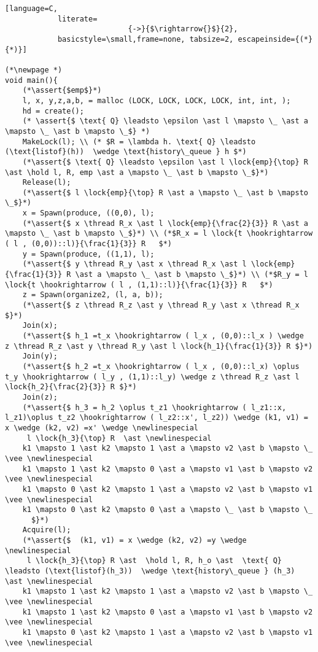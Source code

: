 \documentclass[8pt]{article}
\newcommand{\lock}[2]{ \square \hspace{-1ex} \xrightarrow[#1]{#2}}
\newcommand{\thread}{\ocircle \hspace{-1ex} \rightarrow}
\newcommand{\hold}{\text{Hold }}
\newcommand{\assert}[1]{\textcolor{blue}{ \{ #1 \}  } }
\newcommand{\newlinespecial}{\newline \hphantom{100pt}}
\begin{document}
\begin{lstlisting}[language=C,
			literate=
               				{->}{$\rightarrow{}$}{2},
			basicstyle=\small,frame=none, tabsize=2, escapeinside={(*}{*)}]
		
(*\newpage *)		
void main(){
	(*\assert{$emp$}*)
	l, x, y,z,a,b, = malloc (LOCK, LOCK, LOCK, LOCK, int, int, );
	hd = create();
	(* \assert{$ \text{ Q} \leadsto \epsilon \ast l \mapsto \_ \ast a \mapsto \_ \ast b \mapsto \_$} *)
	MakeLock(l); \\ (* $R = \lambda h. \text{ Q} \leadsto (\text{listof}(h))  \wedge \text{history\_queue } h $*)
	(*\assert{$ \text{ Q} \leadsto \epsilon \ast l \lock{emp}{\top} R \ast \hold l, R, emp \ast a \mapsto \_ \ast b \mapsto \_$}*) 	
	Release(l);
	(*\assert{$ l \lock{emp}{\top} R \ast a \mapsto \_ \ast b \mapsto \_$}*)
	x = Spawn(produce, ((0,0), l);
	(*\assert{$ x \thread R_x \ast l \lock{emp}{\frac{2}{3}} R \ast a \mapsto \_ \ast b \mapsto \_$}*) \\ (*$R_x = l \lock{t \hookrightarrow ( l , (0,0))::l)}{\frac{1}{3}} R   $*)
	y = Spawn(produce, ((1,1), l);
	(*\assert{$ y \thread R_y \ast x \thread R_x \ast l \lock{emp}{\frac{1}{3}} R \ast a \mapsto \_ \ast b \mapsto \_$}*) \\ (*$R_y = l \lock{t \hookrightarrow ( l , (1,1)::l)}{\frac{1}{3}} R   $*)
	z = Spawn(organize2, (l, a, b));
	(*\assert{$ z \thread R_z \ast y \thread R_y \ast x \thread R_x $}*)
	Join(x);
	(*\assert{$ h_1 =t_x \hookrightarrow ( l_x , (0,0)::l_x ) \wedge  z \thread R_z \ast y \thread R_y \ast l \lock{h_1}{\frac{1}{3}} R $}*)
	Join(y);
	(*\assert{$ h_2 =t_x \hookrightarrow ( l_x , (0,0)::l_x) \oplus t_y \hookrightarrow ( l_y , (1,1)::l_y) \wedge z \thread R_z \ast l \lock{h_2}{\frac{2}{3}} R $}*)
	Join(z);
	(*\assert{$ h_3 = h_2 \oplus t_z1 \hookrightarrow ( l_z1::x, l_z1)\oplus t_z2 \hookrightarrow ( l_z2::x', l_z2)) \wedge (k1, v1) = x \wedge (k2, v2) =x' \wedge \newlinespecial
	 l \lock{h_3}{\top} R  \ast \newlinespecial
	k1 \mapsto 1 \ast k2 \mapsto 1 \ast a \mapsto v2 \ast b \mapsto \_ \vee \newlinespecial
	k1 \mapsto 1 \ast k2 \mapsto 0 \ast a \mapsto v1 \ast b \mapsto v2 \vee \newlinespecial
	k1 \mapsto 0 \ast k2 \mapsto 1 \ast a \mapsto v2 \ast b \mapsto v1 \vee \newlinespecial
	k1 \mapsto 0 \ast k2 \mapsto 0 \ast a \mapsto \_ \ast b \mapsto \_
	  $}*)
	Acquire(l);
	(*\assert{$  (k1, v1) = x \wedge (k2, v2) =y \wedge \newlinespecial
	 l \lock{h_3}{\top} R \ast  \hold l, R, h_o \ast  \text{ Q} \leadsto (\text{listof}(h_3))  \wedge \text{history\_queue } (h_3) \ast \newlinespecial
	k1 \mapsto 1 \ast k2 \mapsto 1 \ast a \mapsto v2 \ast b \mapsto \_ \vee \newlinespecial
	k1 \mapsto 1 \ast k2 \mapsto 0 \ast a \mapsto v1 \ast b \mapsto v2 \vee \newlinespecial
	k1 \mapsto 0 \ast k2 \mapsto 1 \ast a \mapsto v2 \ast b \mapsto v1 \vee \newlinespecial

\end{lstlisting}
\end{document}
